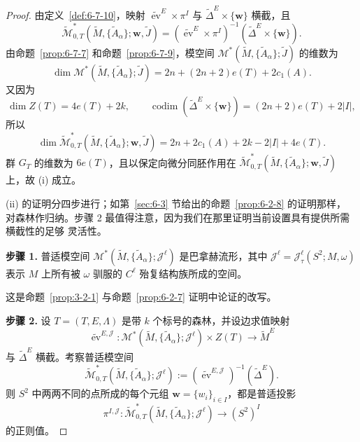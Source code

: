 \begin{proof}
由定义~\ref{def:6-7-10}，映射 $\widetilde{\operatorname{ev}}^E\times\pi^I$ 与
$\widetilde\Delta^E\times\{\mathbf w\}$ 横截，且
\[
  \widetilde{\mathcal M}^*_{0,T}
  (\widetilde M,\{\widetilde A_\alpha\};\mathbf w,\widetilde J)
  =(\widetilde{\operatorname{ev}}^E\times\pi^I)^{-1}
    (\widetilde\Delta^E\times\{\mathbf w\}).
\]
由命题~\ref{prop:6-7-7} 和命题~\ref{prop:6-7-9}，模空间
$\mathcal M^*(\widetilde M,\{\widetilde A_\alpha\};\widetilde J)$ 的维数为
\[
  \dim\mathcal M^*(\widetilde M,\{\widetilde A_\alpha\};\widetilde J)
  =2n+(2n+2)e(T)+2c_1(A).
\]
又因为
\[
  \dim Z(T)=4e(T)+2k,
  \qquad
  \operatorname{codim}(\widetilde\Delta^E\times\{\mathbf w\})
  =(2n+2)e(T)+2|I|,
\]
所以
\[
  \dim\widetilde{\mathcal M}^*_{0,T}
  (\widetilde M,\{\widetilde A_\alpha\};\mathbf w,\widetilde J)
  =2n+2c_1(A)+2k-2|I|+4e(T).
\]
群 $G_T$ 的维数为 $6e(T)$，且以保定向微分同胚作用在
$\widetilde{\mathcal M}^*_{0,T}
(\widetilde M,\{\widetilde A_\alpha\};\mathbf w,\widetilde J)$ 上，故 (i) 成立。

(ii) 的证明分四步进行；如第~\ref{sec:6-3} 节给出的命题~\ref{prop:6-2-8} 的证明那样，
对森林作归纳。步骤 2 最值得注意，因为我们在那里证明当前设置具有提供所需横截性的足够
灵活性。

\medskip
\noindent\textbf{步骤 1.}\quad
{}普适模空间
$\mathcal M^*(\widetilde M,\{\widetilde A_\alpha\};\mathcal J^\ell)$ 是巴拿赫流形，其中
$\mathcal J^\ell=\mathcal J_\tau^\ell(S^2;M,\omega)$ 表示 $M$ 上所有被 $\omega$ 驯服的
$C^\ell$ 殆复结构族所成的空间。

这是命题~\ref{prop:3-2-1} 与命题~\ref{prop:6-2-7} 证明中论证的改写。

\medskip
\noindent\textbf{步骤 2.}\quad
设 $T=(T,E,\Lambda)$ 是带 $k$ 个标号的森林，并设边求值映射
\[
  \widetilde{\operatorname{ev}}^{E,\mathcal J}:
  \mathcal M^*(\widetilde M,\{\widetilde A_\alpha\};\mathcal J^\ell)\times Z(T)
  \longrightarrow\widetilde M^E
\]
与 $\widetilde\Delta^E$ 横截。考察普适模空间
\[
  \widetilde{\mathcal M}^*_{0,T}
  (\widetilde M,\{\widetilde A_\alpha\};\mathcal J^\ell)
  :=(\widetilde{\operatorname{ev}}^{E,\mathcal J})^{-1}(\widetilde\Delta^E).
\]
则 $S^2$ 中两两不同的点所成的每个元组
$\mathbf w=\{w_i\}_{i\in I}$，都是普适投影
\[
  \pi^{I,\mathcal J}:
  \widetilde{\mathcal M}^*_{0,T}
  (\widetilde M,\{\widetilde A_\alpha\};\mathcal J^\ell)
  \longrightarrow(S^2)^I
\]
的正则值。


\end{proof}

